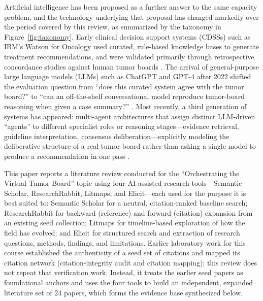 \documentclass[acmsmall,screen=true,review=false,nonacm=true]{acmart}
\begin{document}
Artificial intelligence has been proposed as a further answer to the same capacity problem, and the technology underlying that proposal has changed markedly over the period covered by this review, as summarized by the taxonomy in Figure~\ref{fig:taxonomy}. Early clinical decision support systems (CDSSs) such as IBM's Watson for Oncology used curated, rule-based knowledge bases to generate treatment recommendations, and were validated primarily through retrospective concordance studies against human tumor boards \citep{somashekhar2018,jie2021}. The arrival of general-purpose large language models (LLMs) such as ChatGPT and GPT-4 after 2022 shifted the evaluation question from ``does this curated system agree with the tumor board?'' to ``can an off-the-shelf conversational model reproduce tumor-board reasoning when given a case summary?'' \citep{aliyev2026,chatziisaak2025}. Most recently, a third generation of systems has appeared: multi-agent architectures that assign distinct LLM-driven ``agents'' to different specialist roles or reasoning stages---evidence retrieval, guideline interpretation, consensus deliberation---explicitly modeling the deliberative structure of a real tumor board rather than asking a single model to produce a recommendation in one pass \citep{liu2026,han2025,saenz2026}.

This paper reports a literature review conducted for the ``Orchestrating the Virtual Tumor Board'' topic using four AI-assisted research tools---Semantic Scholar, ResearchRabbit, Litmaps, and Elicit---each used for the purpose it is best suited to: Semantic Scholar for a neutral, citation-ranked baseline search; ResearchRabbit for backward (reference) and forward (citation) expansion from an existing seed collection; Litmaps for timeline-based exploration of how the field has evolved; and Elicit for structured search and extraction of research questions, methods, findings, and limitations. Earlier laboratory work for this course established the authenticity of a seed set of citations and mapped its citation network (citation-integrity audit and citation mapping); this review does not repeat that verification work. Instead, it treats the earlier seed papers as foundational anchors and uses the four tools to build an independent, expanded literature set of 24 papers, which forms the evidence base synthesized below.
\end{document}
